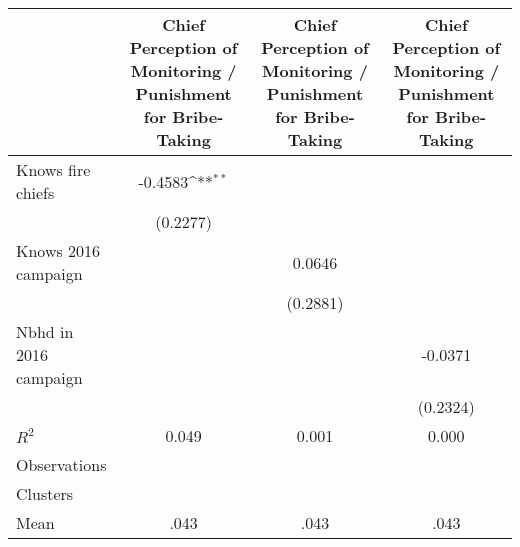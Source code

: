 {
\def\sym#1{\ifmmode^{#1}\else\(^{#1}\)\fi}
\begin{tabular}{l*{3}{c}}
\hline\hline
                &\multicolumn{1}{c}{Chief Perception of Monitoring / Punishment for Bribe-Taking}&\multicolumn{1}{c}{Chief Perception of Monitoring / Punishment for Bribe-Taking}&\multicolumn{1}{c}{Chief Perception of Monitoring / Punishment for Bribe-Taking}\\
\hline
Knows fire chiefs&  -0.4583\sym{**} &                  &                  \\
                & (0.2277)         &                  &                  \\
Knows 2016 campaign&                  &   0.0646         &                  \\
                &                  & (0.2881)         &                  \\
Nbhd in 2016 campaign&                  &                  &  -0.0371         \\
                &                  &                  & (0.2324)         \\
\hline
\(R^{2}\)       &    0.049         &    0.001         &    0.000         \\
Observations    &                  &                  &                  \\
Clusters        &                  &                  &                  \\
Mean            &     .043         &     .043         &     .043         \\
\hline\hline
\end{tabular}
}
